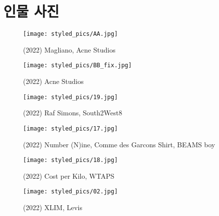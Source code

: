 \section*{인물 사진}
\begin{minipage}[h!]{0.5\textwidth}
    \begin{figure}[H]
        \centering
        \texttt{[image: styled\_pics/AA.jpg]}
        \caption*{(2022) Magliano, Acne Studios}
    \end{figure}
\end{minipage}
\begin{minipage}[h!]{0.5\textwidth}
    \begin{figure}[H]
        \centering
        \texttt{[image: styled\_pics/BB\_fix.jpg]}
        \caption*{(2022) Acne Studios}
    \end{figure}
\end{minipage}
\begin{minipage}[h!]{0.5\textwidth}
    \begin{figure}[H]
        \centering
        \texttt{[image: styled\_pics/19.jpg]}
        \caption*{(2022) Raf Simons, South2West8}
    \end{figure}
\end{minipage}
\begin{minipage}[h!]{0.5\textwidth}
    \begin{figure}[H]
        \centering
        \texttt{[image: styled\_pics/17.jpg]}
        \caption*{(2022) Number (N)ine, Comme des Garcons Shirt, BEAMS boy}
    \end{figure}
\end{minipage}
\begin{minipage}[h!]{0.5\textwidth}
    \begin{figure}[H]
        \centering
        \texttt{[image: styled\_pics/18.jpg]}
        \caption*{(2022) Cost per Kilo, WTAPS}
    \end{figure}
\end{minipage}
\begin{minipage}[h!]{0.5\textwidth}
    \begin{figure}[H]
        \centering
        \texttt{[image: styled\_pics/02.jpg]}
        \caption*{(2022) XLIM, Levis}
    \end{figure}
\end{minipage}
